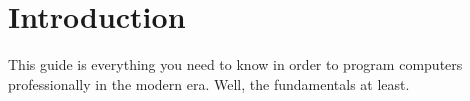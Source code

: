 \newpage


\part*{Introduction}


This guide is everything you need to know in order to program computers professionally in the modern era. Well, the fundamentals at least.




